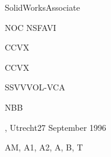 \begin{cSection}{\textwidth}{0.47\textwidth}{0.48\textwidth}
{        %
        \begin{cSubsection}{}
            \begin{experienceItem} {SolidWorks}{Associate}{}{} \end{experienceItem}
            \begin{experienceItem} {NOC NSF}{AVI}{}{} \end{experienceItem}
            \begin{experienceItem} {CCVX}{}{}{} \end{experienceItem}
            \begin{experienceItem} {CCVX}{}{}{} \end{experienceItem}
            \begin{experienceItem} {SSVV}{VOL-VCA }{}{} \end{experienceItem}
            \begin{experienceItem} {}{}{}{} \end{experienceItem}
            \begin{experienceItem} {NBB}{}{}{} \end{experienceItem}
        \end{cSubsection}
    }
    {%
        \begin{cSubsection}{}
            \begin{experienceItem} {, Utrecht}{27 September 1996}{}{} \end{experienceItem}
            \begin{experienceItem} {}{}{}{} \end{experienceItem}
            \begin{experienceItem} {}{AM, A1, A2, A, B, T}{}{} \end{experienceItem}
        \end{cSubsection}

}
\end{cSection}
